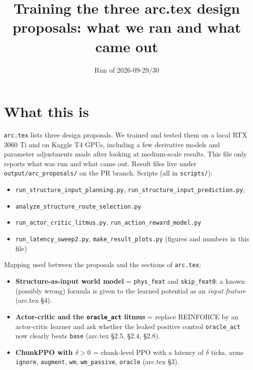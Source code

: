 \documentclass[11pt]{article}
\title{Training the three arc.tex design proposals: what we ran and what came out}
\author{}
\date{Run of 2026-09-29/30}
\newcommand{\srcpath}[1]{\texttt{\small #1}}
\begin{document}
\maketitle

\section{What this is}

\texttt{arc.tex} lists three design proposals. We trained and tested them on a local RTX 3060 Ti and on Kaggle T4 GPUs, including a few derivative models and
parameter adjustments made after looking at medium-scale results. This file only reports what was run and what came out. Result files live under \srcpath{output/arc\_proposals/} on the PR branch. Scripts (all in \srcpath{scripts/}):
\begin{itemize}\itemsep0pt
\item \srcpath{run\_structure\_input\_planning.py}, \srcpath{run\_structure\_input\_prediction.py},
\item \srcpath{analyze\_structure\_route\_selection.py}
\item \srcpath{run\_actor\_critic\_litmus.py}, \srcpath{run\_action\_reward\_model.py}
\item \srcpath{run\_latency\_sweep2.py}, \srcpath{make\_result\_plots.py} (figures and numbers in this file)
\end{itemize}

Mapping used between the proposals and the sections of \texttt{arc.tex}:
\begin{itemize}
\item \textbf{Structure-as-input world model} = \texttt{phys\_feat} and \texttt{skip\_feat0}: a known (possibly wrong) formula is given to the learned potential as an \emph{input feature} (arc.tex \S4).
\item \textbf{Actor-critic and the \texttt{oracle\_act} litmus} = replace REINFORCE by an actor-critic learner and ask whether the leaked positive control \texttt{oracle\_act} now clearly beats \texttt{base} (arc.tex \S2.5, \S2.4, \S2.8).
\item \textbf{ChunkPPO with $\delta>0$} = chunk-level PPO with a latency of $\delta$ ticks, arms \texttt{ignore}, \texttt{augment}, \texttt{wm}, \texttt{wm\_passive}, \texttt{oracle} (arc.tex \S3).
\end{itemize}
\end{document}
